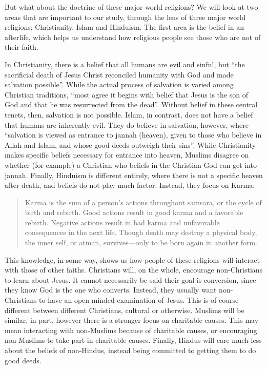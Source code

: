 \documentclass[]{article}
\begin{document}
But what about the doctrine of these major world religions? We will look
at two areas that are important to our study, through the lens of three
major world religions; Christianity, Islam and Hinduism. The first area
is the belief in an afterlife, which helps us understand how religious
people see those who are not of their faith.

In Christianity, there is a belief that all humans are evil and sinful,
but ``the sacrificial death of Jesus Christ reconciled humanity with God
and made salvation possible''\autocite[pg 59]{Boyett12MajorWorld2016}.
While the actual process of salvation is varied among Christian
traditions, ``most agree it begins with belief that Jesus is the son of
God and that he was resurrected from the
dead''\autocite[pg 59]{Boyett12MajorWorld2016}. Without belief in these
central tenets, then, salvation is not possible. Islam, in contrast,
does not have a belief that humans are inherently evil. They do believe
in salvation, however, where ``salvation is viewed as entrance to jannah
(heaven), given to those who believe in Allah and Islam, and whose good
deeds outweigh their sins''\autocite[pg 85]{Boyett12MajorWorld2016}.
While Christianity makes specific beliefs necessary for entrance into
heaven, Muslims disagree on whether (for example) a Christian who
beliefs in the Christian God can get into jannah. Finally, Hinduism is
different entirely, where there is not a specific heaven after death,
and beliefs do not play much factor. Instead, they focus on Karma:

\begin{quote}
Karma is the sum of a person's actions throughout samsara, or the cycle
of birth and rebirth. Good actions result in good karma and a favorable
rebirth. Negative actions result in bad karma and unfavorable
consequences in the next life. Though death may destroy a physical body,
the inner self, or atman, survives---only to be born again in another
form.\autocite[pg 104]{Boyett12MajorWorld2016}
\end{quote}

This knowledge, in some way, shows us how people of these religions will
interact with those of other faiths. Christians will, on the whole,
encourage non-Christians to learn about Jesus. It cannot necessarily be
said their goal is conversion, since they know God is the one who
converts. Instead, they usually want non-Christians to have an
open-minded examination of Jesus. This is of course different between
different Christians, cultural or otherwise. Muslims will be similar, in
part, however there is a stronger focus on charitable causes. This may
mean interacting with non-Muslims because of charitable causes, or
encouraging non-Muslims to take part in charitable causes. Finally,
Hindus will care much less about the beliefs of non-Hindus, instead
being committed to getting them to do good deeds.
\end{document}
